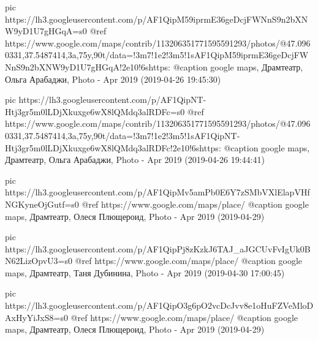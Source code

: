     pic https://lh3.googleusercontent.com/p/AF1QipM59iprmE36geDcjFWNnS9n2bXNW9yD1U7gHGqA=s0
     @ref https://www.google.com/maps/contrib/113206351771595591293/photos/@47.0960331,37.5487414,3a,75y,90t/data=!3m7!1e2!3m5!1sAF1QipM59iprmE36geDcjFWNnS9n2bXNW9yD1U7gHGqA!2e10!6shttps:%
     @caption google maps, Драмтеатр, Ольга Арабаджи, Photo - Apr 2019 (2019-04-26 19:45:30)

     pic https://lh3.googleusercontent.com/p/AF1QipNT-Htj3gr5m0lLDjXkuxge6wX8lQMdq3alRDFc=s0
     @ref https://www.google.com/maps/contrib/113206351771595591293/photos/@47.0960331,37.5487414,3a,75y,90t/data=!3m7!1e2!3m5!1sAF1QipNT-Htj3gr5m0lLDjXkuxge6wX8lQMdq3alRDFc!2e10!6shttps:%
     @caption google maps, Драмтеатр, Ольга Арабаджи, Photo - Apr 2019 (2019-04-26 19:44:41)

     pic https://lh3.googleusercontent.com/p/AF1QipMv5amPb0E6Y7zSMbVXlElapVHfNGKyneOjGutf=s0
     @ref https://www.google.com/maps/place/%
     @caption google maps, Драмтеатр, Олеся Плющероид, Photo - Apr 2019 (2019-04-29)

     pic https://lh3.googleusercontent.com/p/AF1QipPj8zKzkJ6TAJ_aJGCUvFvIgUk0BN62LizOpvU3=s0
     @ref https://www.google.com/maps/place/%
     @caption google maps, Драмтеатр, Таня Дубинина, Photo - Apr 2019 (2019-04-30 17:00:45)

     pic https://lh3.googleusercontent.com/p/AF1QipO3g6pO2vcDcJvv8e1oHuFZVeMloDAxHyYiJxS8=s0
     @ref https://www.google.com/maps/place/%
     @caption google maps, Драмтеатр, Олеся Плющероид, Photo - Apr 2019 (2019-04-29)

